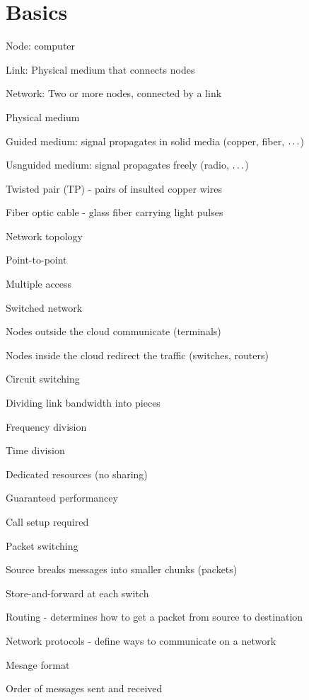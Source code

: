 \section{Basics}
\enumstart
	\item Node: computer
	\item Link: Physical medium that connects nodes
	\item Network: Two or more nodes, connected by a link
	\item Physical medium
	\enumstart
		\item Guided medium: signal propagates in solid media (copper, fiber, $\mathellipsis$)
		\item Usnguided medium: signal propagates freely (radio, $\mathellipsis$)
		\item Twisted pair (TP) - pairs of insulted copper wires
		\item Fiber optic cable - glass fiber carrying light pulses
	\enumend
	\item Network topology
	\enumstart
		\item Point-to-point
		\item Multiple access
	\enumend
	\item Switched network
	\enumstart
		\item Nodes outside the cloud communicate (terminals)
		\item Nodes inside the cloud redirect the traffic (switches, routers)
		\item Circuit switching
		\enumstart
			\item Dividing link bandwidth into pieces
			\enumstart
				\item Frequency division
				\item Time division
			\enumend
			\item Dedicated resources (no sharing)
			\item Guaranteed performancey
			\item Call setup required
		\enumend
		\item Packet switching
		\enumstart
			\item Source breaks messages into smaller chunks (packets)
			\item Store-and-forward at each switch
		\enumend
	\enumend
	\item Routing - determines how to get a packet from source to destination
	\item Network protocols - define ways to communicate on a network
	\enumstart
		\item Mesage format
		\item Order of messages sent and received
